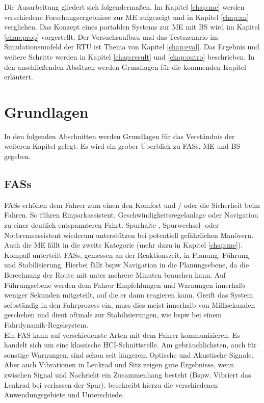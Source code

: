 {Die Ausarbeitung gliedert sich folgendermaßen. Im Kapitel \ref{chap:me} werden verschiedene Forschungsergebnisse zur \acl{ME} aufgezeigt und in Kapitel \ref{chap:an} verglichen. Das Konzept eines portablen Systems zur \acl{ME} mit \acl{BS} wird im Kapitel \ref{chap:prop} vorgestellt. Der Versuchsaufbau und das Testszenario im Simulationsumfeld der \acl{RTU} ist Thema von Kapitel \ref{chap:eval}. Das Ergebnis und weitere Schritte werden in Kapitel \ref{chap:result} und \ref{chap:outro} beschrieben. In den anschließenden Absätzen werden Grundlagen für die kommenden Kapitel erläutert.

\section{Grundlagen}
In den folgenden Abschnitten werden Grundlagen für das Verständnis der weiteren Kapitel gelegt. Es wird ein grober Überblick zu \acl{FASs}, \acl{ME} und \acl{BS} gegeben.

\subsection{\acl{FASs}}
\acl{FASs} erhöhen dem Fahrer zum einen den Komfort und / oder die Sicherheit beim Fahren. So führen Einparkassistent,  Geschwindigkeitsregelanlage oder Navigation zu einer deutlich entspannteren Fahrt. Spurhalte-, Spurwechsel- oder Notbremsassistent wiederum unterstützen bei potentiell gefährlichen Manövern. Auch die \acl{ME} fällt in die zweite Kategorie (mehr dazu in Kapitel \ref{chap:me}).\\

Kompaß \cite{fasFuture} unterteilt \acl{FASs}, gemessen an der Reaktionszeit, in Planung, Führung und Stabilisierung. Hierbei fällt \acl{bspw} Navigation in die Planungsebene, da die Berechnung der Route mit unter mehrere Minuten brauchen kann. Auf Führungsebene werden dem Fahrer Empfehlungen und Warnungen innerhalb weniger Sekunden mitgeteilt, auf die er dann reagieren kann. Greift das System selbständig in den Fahrprozess ein, muss dies meist innerhalb von Millisekunden geschehen und dient oftmals zur Stabilisierungen, wie \acl{bspw} bei einem Fahrdynamik-Regelsystem.\\

Ein \acl{FAS} kann auf verschiedenste Arten mit dem Fahrer kommunizieren. Es handelt sich um eine klassische HCI-Schnittstelle. Am gebräuchlichsten, auch für sonstige Warnungen, sind schon seit längerem Optische und Akustische Signale. Aber auch Vibrationen in Lenkrad und Sitz zeigen gute Ergebnisse, wenn zwischen Signal und Nachricht ein Zusammenhang besteht (Bspw. Vibriert das Lenkrad bei verlassen der Spur).
\cite{Bertoldi:2010:MAD:2002368.2002370} beschreibt hierzu die verschiedenen Anwendungsgebiete und Unterschiede. \\

}
